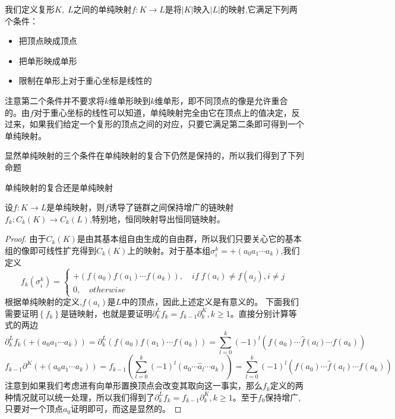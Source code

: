 \begin{definition}
我们定义复形$K,\;L$之间的单纯映射$f:K\rightarrow L$是将$|K|$映入$|L|$的映射,它满足下列两个条件：
\begin{itemize}
    \item 把顶点映成顶点
    \item 把单形映成单形
    \item 限制在单形上对于重心坐标是线性的
\end{itemize}
\end{definition}
\begin{remark}
注意第二个条件并不要求将$k$维单形映到$k$维单形，即不同顶点的像是允许重合的。由$f$对于重心坐标的线性可以知道，单纯映射完全由它在顶点上的值决定，反过来，如果我们给定一个复形的顶点之间的对应，只要它满足第二条即可得到一个单纯映射。
\end{remark}
显然单纯映射的三个条件在单纯映射的复合下仍然是保持的，所以我们得到了下列命题
\begin{proposition}
单纯映射的复合还是单纯映射
\end{proposition}
\begin{proposition}\label{chap1_pro_1545}
设$f:K\rightarrow L$是单纯映射，则$f$诱导了链群之间保持增广的链映射$f_{k}:C_{k}(K)\rightarrow C_{k}(L)$,特别地，恒同映射导出恒同链映射。
\end{proposition}
\begin{proof}
由于$C_{k}(K)$是由其基本组自由生成的自由群，所以我们只要关心它的基本组的像即可线性扩充得到$C_{k}(K)$上的映射。对于基本组$\sigma^{k}_{i}=+(a_{0}a_{1}\cdots a_{k})$,我们定义
\begin{equation*}
    f_{k}(\sigma^{k}_{i})=\left\{\begin{array}{cc}
         +(f(a_{0})f(a_{1})\cdots f(a_{k})),\quad if\;f(a_{i})\neq f(a_{j}),i\neq j  \\
         0,\quad otherwise
    \end{array}\right.
\end{equation*}
根据单纯映射的定义,$f(a_{i})$是$L$中的顶点，因此上述定义是有意义的。
下面我们需要证明$\left\{f_{k}\right\}$是链映射，也就是要证明$\partial^{L}_{k}f_{k}=f_{k-1}\partial^{K}_{k},k\geq 1$。直接分别计算等式的两边
\begin{equation*}
    \partial^{L}_{k}f_{k}(+(a_{0}a_{1}\cdots a_{k}))=\partial^{L}_{k}(f(a_{0})f(a_{1})\cdots f(a_{k}))=\sum\limits_{l=0}^{k}(-1)^{l}\left(f(a_{0})\cdots \hat{f}(a_{l})\cdots f(a_{k})\right)
\end{equation*}
\begin{equation*}
    f_{k-1}\partial^{K}(+(a_{0}a_{1}\cdots a_{k}))=f_{k-1}\left(\sum\limits_{l=0}^{k}(-1)^{l}\left(a_{0}\cdots \hat{a}_{l}\cdots a_{k}\right)\right)=\sum\limits_{l=0}^{k}(-1)^{l}\left(f(a_{0})\cdots \hat{f}(a_{l})\cdots f(a_{k})\right)
\end{equation*}
注意到如果我们考虑进有向单形置换顶点会改变其取向这一事实，那么$f_{k}$定义的两种情况就可以统一处理，所以我们得到了$\partial^{L}_{k}f_{k}=f_{k-1}\partial^{K}_{k},k\geq 1$。至于$f_{0}$保持增广,只要对一个顶点$a_{0}$证明即可，而这是显然的。
\end{proof}
